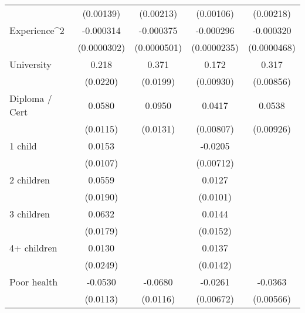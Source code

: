 {\begin{tabular}{l*{4}{c}}
                    &   (0.00139)         &   (0.00213)         &   (0.00106)         &   (0.00218)         \\
[1em]
Experience^{2}      &   -0.000314\sym{***}&   -0.000375\sym{***}&   -0.000296\sym{***}&   -0.000320\sym{***}\\
                    & (0.0000302)         & (0.0000501)         & (0.0000235)         & (0.0000468)         \\
[1em]
University          &       0.218\sym{***}&       0.371\sym{***}&       0.172\sym{***}&       0.317\sym{***}\\
                    &    (0.0220)         &    (0.0199)         &   (0.00930)         &   (0.00856)         \\
[1em]
Diploma / Cert      &      0.0580\sym{***}&      0.0950\sym{***}&      0.0417\sym{***}&      0.0538\sym{***}\\
                    &    (0.0115)         &    (0.0131)         &   (0.00807)         &   (0.00926)         \\
[1em]
1 child             &      0.0153         &                     &     -0.0205\sym{**} &                     \\
                    &    (0.0107)         &                     &   (0.00712)         &                     \\
[1em]
2 children          &      0.0559\sym{**} &                     &      0.0127         &                     \\
                    &    (0.0190)         &                     &    (0.0101)         &                     \\
[1em]
3 children          &      0.0632\sym{***}&                     &      0.0144         &                     \\
                    &    (0.0179)         &                     &    (0.0152)         &                     \\
[1em]
4+ children         &      0.0130         &                     &      0.0137         &                     \\
                    &    (0.0249)         &                     &    (0.0142)         &                     \\
[1em]
Poor health         &     -0.0530\sym{***}&     -0.0680\sym{***}&     -0.0261\sym{***}&     -0.0363\sym{***}\\
                    &    (0.0113)         &    (0.0116)         &   (0.00672)         &   (0.00566)         \\

\end{tabular}}
